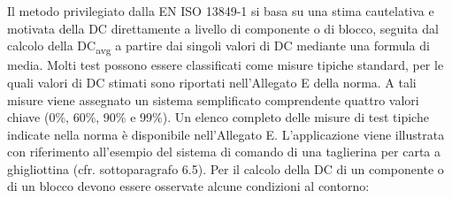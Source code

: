 Il metodo privilegiato dalla EN ISO 13849-1 si basa su una stima cautelativa e motivata della DC direttamente a livello di componente o di blocco, seguita dal calcolo della DC\textsubscript{avg} a partire dai singoli valori di DC mediante una formula di media. Molti test possono essere classificati come misure tipiche standard, per le quali valori di DC stimati sono riportati nell'Allegato E della norma. A tali misure viene assegnato un sistema semplificato comprendente quattro valori chiave (0\%, 60\%, 90\% e 99\%). Un elenco completo delle misure di test tipiche indicate nella norma è disponibile nell'Allegato E. L'applicazione viene illustrata con riferimento all'esempio del sistema di comando di una taglierina per carta a ghigliottina (cfr. sottoparagrafo 6.5).
Per il calcolo della DC di un componente o di un blocco devono essere osservate alcune condizioni al contorno:
